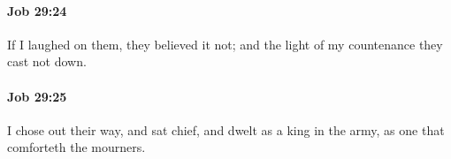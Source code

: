 		\paragraph{Job 29:24} %
			\label{JOB-29-24}

			If I laughed on them, they believed it not; and the light of my countenance they cast not down.


		\paragraph{Job 29:25} %
			\label{JOB-29-25}

			I chose out their way, and sat chief, and dwelt as a king in the army, as one that comforteth the mourners.

